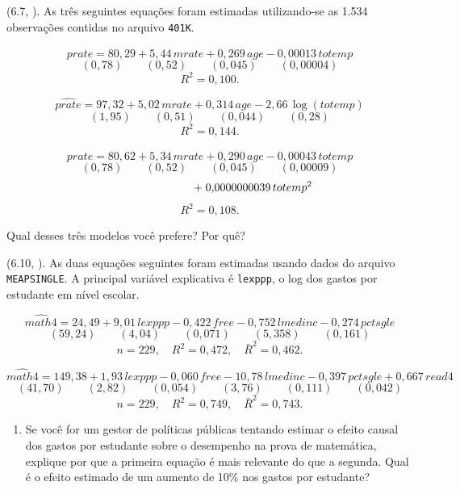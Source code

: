 \documentclass[12pt,letterpaper, onecolumn]{exam}
\begin{document}
	\begin{questions}
		
		\question (6.7, \citep{wooldridge2016}). As três seguintes equações foram estimadas utilizando-se as 1.534 observações contidas no arquivo \texttt{401K}.
		
		\[
		\widehat{prate} = 80{,}29 + 5{,}44\,mrate + 0{,}269\,age - 0{,}00013\,totemp
		\]
		\[
		(0{,}78)\qquad (0{,}52)\qquad (0{,}045)\qquad (0{,}00004)
		\]
		\[
		R^2 = 0{,}100.
		\]
		
		\[
		\widehat{prate} = 97{,}32 + 5{,}02\,mrate + 0{,}314\,age - 2{,}66\,\log(totemp)
		\]
		\[
		(1{,}95)\qquad (0{,}51)\qquad (0{,}044)\qquad (0{,}28)
		\]
		\[
		R^2 = 0{,}144.
		\]
		
		\[
		\widehat{prate} = 80{,}62 + 5{,}34\,mrate + 0{,}290\,age - 0{,}00043\,totemp
		\]
		\[
		(0{,}78)\qquad (0{,}52)\qquad (0{,}045)\qquad (0{,}00009)
		\]
		\[
		\hspace{2.7cm} +\; 0{,}0000000039\,totemp^2
		\]
		\[
		R^2 = 0{,}108.
		\]
		
		Qual desses três modelos você prefere? Por quê?
		
		\vspace{0.7cm}
		
		\question\qstar (6.10, \citep{wooldridge2016}). As duas equações seguintes foram estimadas usando dados do arquivo \texttt{MEAPSINGLE}. A principal variável explicativa é \texttt{lexppp}, o log dos gastos por estudante em nível escolar.
		
		\[
		\widehat{math4} = 24{,}49 + 9{,}01\,lexppp - 0{,}422\,free - 0{,}752\,lmedinc - 0{,}274\,pctsgle
		\]
		\[
		(59{,}24)\qquad (4{,}04)\qquad (0{,}071)\qquad (5{,}358)\qquad (0{,}161)
		\]
		\[
		n = 229,\quad R^2 = 0{,}472,\quad \bar{R}^2 = 0{,}462.
		\]
		
		\[
		\widehat{math4} = 149{,}38 + 1{,}93\,lexppp - 0{,}060\,free - 10{,}78\,lmedinc - 0{,}397\,pctsgle + 0{,}667\,read4
		\]
		\[
		(41{,}70)\qquad (2{,}82)\qquad (0{,}054)\qquad (3{,}76)\qquad (0{,}111)\qquad (0{,}042)
		\]
		\[
		n = 229,\quad R^2 = 0{,}749,\quad \bar{R}^2 = 0{,}743.
		\]
		
		\begin{enumerate}[label=(\roman*)]
			\item Se você for um gestor de políticas públicas tentando estimar o efeito causal dos gastos por estudante sobre o desempenho na prova de matemática, explique por que a primeira equação é mais relevante do que a segunda. Qual é o efeito estimado de um aumento de 10\% nos gastos por estudante?
			

\end{enumerate}
\end{questions}
\end{document}
